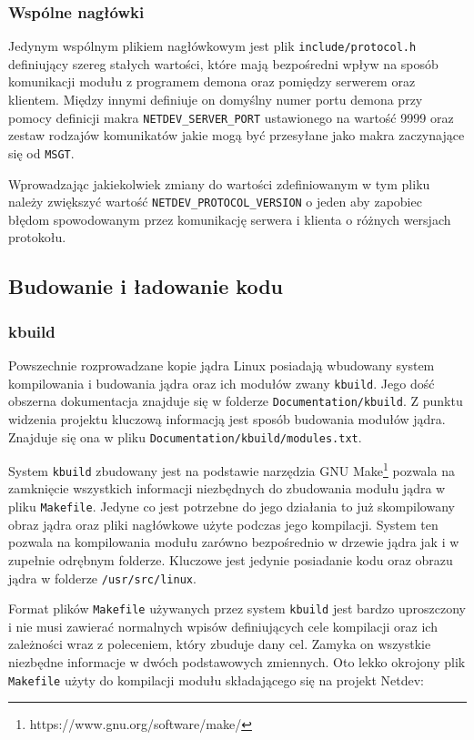 \documentclass[11pt]{scrartcl}
\begin{document}
\subsubsection{Wspólne nagłówki}

Jedynym wspólnym plikiem nagłówkowym jest plik \texttt{include/protocol.h} definiujący szereg stałych wartości, które mają bezpośredni wpływ na sposób komunikacji modułu z programem demona oraz pomiędzy serwerem oraz klientem. Między innymi definiuje on domyślny numer portu demona przy pomocy definicji makra \texttt{NETDEV\_SERVER\_PORT} ustawionego na wartość 9999 oraz zestaw rodzajów komunikatów jakie mogą być przesyłane jako makra zaczynające się od \texttt{MSGT}.

Wprowadzając jakiekolwiek zmiany do wartości zdefiniowanym w tym pliku należy zwiększyć wartość \texttt{NETDEV\_PROTOCOL\_VERSION} o jeden aby zapobiec błędom spowodowanym przez komunikację serwera i klienta o różnych wersjach protokołu.

\subsection{Budowanie i ładowanie kodu}

\subsubsection{kbuild}

Powszechnie rozprowadzane kopie jądra Linux posiadają wbudowany system kompilowania i budowania jądra oraz ich modułów zwany \texttt{kbuild}. Jego dość obszerna dokumentacja znajduje się w folderze \texttt{Documentation/kbuild}. Z punktu widzenia projektu kluczową informacją jest sposób budowania modułów jądra. Znajduje się ona w pliku \texttt{Documentation/kbuild/modules.txt}.

System \texttt{kbuild} zbudowany jest na podstawie narzędzia GNU Make\footnote{https://www.gnu.org/software/make/} pozwala na zamknięcie wszystkich informacji niezbędnych do zbudowania modułu jądra w pliku \texttt{Makefile}. Jedyne co jest potrzebne do jego działania to już skompilowany obraz jądra oraz pliki nagłówkowe użyte podczas jego kompilacji. System ten pozwala na kompilowania modułu zarówno bezpośrednio w drzewie jądra jak i w zupełnie odrębnym folderze. Kluczowe jest jedynie posiadanie kodu oraz obrazu jądra w folderze \texttt{/usr/src/linux}.

Format plików \texttt{Makefile} używanych przez system \texttt{kbuild} jest bardzo uproszczony i nie musi zawierać normalnych wpisów definiujących cele kompilacji oraz ich zależności wraz z poleceniem, który zbuduje dany cel. Zamyka on wszystkie niezbędne informacje w dwóch podstawowych zmiennych. Oto lekko okrojony plik \texttt{Makefile} użyty do kompilacji modułu składającego się na projekt Netdev:
\end{document}
